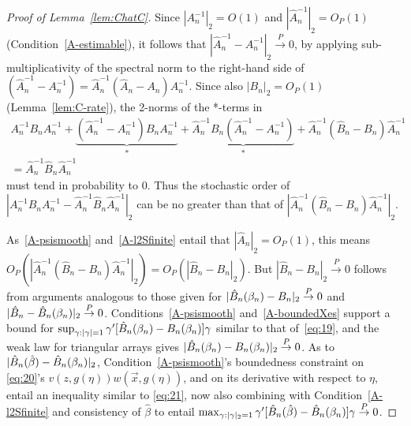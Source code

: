 \documentclass{article}
\theoremstyle{remark}
\begin{document}
\begin{proof}[Proof of Lemma~\ref{lem:ChatC}]
Since $|{A}_{n}^{-1}|_{2}=O(1)$ and $|\hat{A}_{n}^{-1}|_{2}= O_{P}(1)$ (Condition~\ref{A-estimable}), it follows that $|\hat{A}_{n}^{-1} - A_{n}^{-1}|_{2} \stackrel{P}{\rightarrow} 0$, by applying sub-multiplicativity of the spectral norm to the right-hand side of 
$(\hat{A}_{n}^{-1} - A_{n}^{-1}) = \hat{A}_{n}^{-1} (\hat{A}_{n} - A_{n}) {A}_{n}^{-1}$.  Since also $|B_{n}|_{2} = O_{P}(1)$ (Lemma~\ref{lem:C-rate}), 
the 2-norms of the *-terms in 
\begin{multline*}
  A_{n}^{-1}B_{n}A_{n}^{-1}  + \underbrace{(\hat{A}_{n}^{-1} - A_{n}^{-1})B_{n}A_{n}^{-1}}_{*} + \underbrace{\hat{A}_{n}^{-1}B_{n}(\hat{A}_{n}^{-1} - A_{n}^{-1})}_{*}   + \hat{A}_{n}^{-1}(\hat{B}_{n} - B_{n})\hat{A}_{n}^{-1}  \\[-2ex]
=  \hat{A}_{n}^{-1}\hat{B}_{n}\hat{A}_{n}^{-1}
\end{multline*}
must tend in probability to 0.  Thus the stochastic order of $|A_{n}^{-1}B_{n}A_{n}^{-1} - \hat{A}_{n}^{-1}\hat{B}_{n}\hat{A}_{n}^{-1}|_{2}$ can be no greater than that of $|\hat{A}_{n}^{-1}(\hat{B}_{n} - B_{n}) \hat{A}_{n}^{-1}|_{2}$.  

As~\ref{A-psismooth} and~\ref{A-l2Sfinite} entail that $|\hat{A}_{n}|_{2} = O_{P}(1)$, this means $O_{P}(|\hat{A}_{n}^{-1}(\hat{B}_{n} - B_{n}) \hat{A}_{n}^{-1}|_{2}) = O_{P}(|\hat{B}_{n} - B_{n}|_{2})$. But $|\hat{B}_{n} - B_{n}|_{2} \stackrel{P}{\rightarrow} 0$ follows from arguments analogous to those given for %
$|\hat{B}_{n}(\beta_{n }) - B_{n}|_{2} \stackrel{P}{\rightarrow} 0$ and $|\hat{B}_{n} - \hat{B}_{n}(\beta_{n })|_{2} \stackrel{P}{\rightarrow} 0$.   Conditions~\ref{A-psismooth}  and~\ref{A-boundedXes} support a bound for $\sup_{\gamma: |\gamma|=1}\gamma'[\hat{B}_{n}(\beta_{n }) - B_{n}(\beta_{n })]\gamma$ similar to that of~\eqref{eq:19}, and the weak law for triangular arrays gives $|\hat{B}_{n}(\beta_{n }) - B_{n}(\beta_{n })|_{2} \stackrel{P}{\rightarrow} 0$.   As to $|\hat{B}_{n}(\hat\beta) - \hat{B}_{n}(\beta_{n })|_{2}$, Condition~\ref{A-psismooth}'s boundedness constraint on \eqref{eq:20}'s $v(z, g(\eta))w(\vec{x}, g(\eta))$, and on its derivative with respect to $\eta$, entail an inequality similar to \eqref{eq:21}, now also combining with Condition~\ref{A-l2Sfinite} and consistency of $\hat\beta$ to entail $\max_{\gamma: |\gamma|_{2}=1} \gamma'[\hat{B}_{n}(\hat\beta) - \hat{B}_{n}(\beta_{n }) ]\gamma \stackrel{P}{\rightarrow} 0$.
\end{proof}
\end{document}
